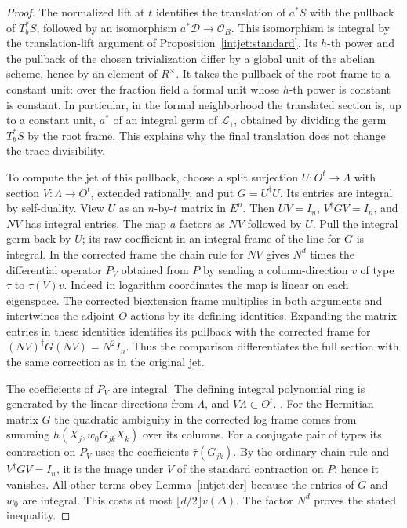 \begin{proof}
The normalized lift at \(t\) identifies the translation of
\(a^*S\) with the pullback of \(T_b^*S\), followed by an
isomorphism \(a^*\mathcal D\to\mathcal O_B\). This isomorphism
is integral by the translation-lift argument of
Proposition~\ref{intjet:standard}. Its \(h\)-th power and the
pullback of the chosen trivialization differ by a global unit
of the abelian scheme, hence by an element of \(R^\times\).
It takes the pullback of the root frame to a constant unit:
over the fraction field a formal unit whose \(h\)-th power is
constant is constant. In particular, in the formal neighborhood
the translated section is, up to a constant unit, \(a^*\) of
an integral germ of \(\mathcal L_1\), obtained by dividing the
germ \(T_b^*S\) by the root frame. This explains why the final
translation does not change the trace divisibility.

To compute the jet of this pullback, choose a split surjection
\(U:O^t\to\Lambda\) with section \(V:\Lambda\to O^t\),
extended rationally, and put \(G=U^\dagger U\). Its entries
are integral by self-duality. View \(U\) as an \(n\)-by-\(t\)
matrix in \(E^n\). Then \(UV=I_n\), \(V^\dagger G V=I_n\),
and \(NV\) has integral entries. The map \(a\) factors as \(NV\)
followed by \(U\). Pull the integral germ back by \(U\); its raw
coefficient in an integral frame of the line for \(G\) is integral.
In the corrected frame the chain rule for \(NV\) gives \(N^d\)
times the differential operator \(P_V\) obtained from \(P\)
by sending a column-direction \(v\) of type \(\tau\) to
\(\tau(V)v\). Indeed in logarithm coordinates the map is
linear on each eigenspace. The corrected biextension frame
multiplies in both arguments and intertwines the adjoint
\(O\)-actions by its defining identities. Expanding the matrix
entries in these identities identifies its pullback with the
corrected frame for \((NV)^\dagger G(NV)=N^2 I_n\).
Thus the comparison differentiates the full section with the
same correction as in the original jet.

The coefficients of \(P_V\) are integral. The defining integral
polynomial ring is generated by the linear directions from
\(\Lambda\), and \(V\Lambda\subset O^t\).
.
For the Hermitian matrix \(G\) the quadratic ambiguity in the
corrected log frame comes from summing
\(h(X_j,w_0G_{jk}X_k)\) over its columns. For a conjugate pair
of types its contraction on \(P_V\) uses the coefficients
\(\bar\tau(G_{jk})\). By the ordinary chain rule and
\(V^\dagger G V=I_n\), it is the image under \(V\) of the standard
contraction on \(P\); hence it vanishes. All other terms obey
Lemma~\ref{intjet:der} because the entries of \(G\) and \(w_0\)
are integral. This costs at most \(\lfloor d/2\rfloor v(\Delta)\).
The factor \(N^d\) proves the stated inequality.
\end{proof}

